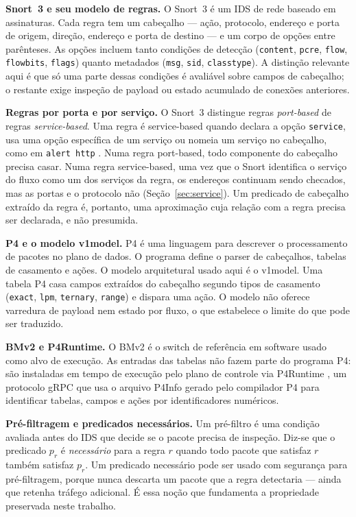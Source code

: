 \documentclass[12pt]{article}
\begin{document}
\textbf{Snort~3 e seu modelo de regras.} O Snort~3 é um IDS de rede baseado em
assinaturas. Cada regra tem um cabeçalho --- ação, protocolo, endereço e porta
de origem, direção, endereço e porta de destino --- e um corpo de opções entre
parênteses. As opções incluem tanto condições de detecção (\texttt{content},
\texttt{pcre}, \texttt{flow}, \texttt{flowbits}, \texttt{flags}) quanto
metadados (\texttt{msg}, \texttt{sid}, \texttt{classtype}). A distinção
relevante aqui é que só uma parte dessas condições é avaliável sobre campos de
cabeçalho; o restante exige inspeção de payload ou estado acumulado de
conexões anteriores.

\textbf{Regras por porta e por serviço.} O Snort~3 distingue regras
\emph{port-based} de regras \emph{service-based}. Uma regra é service-based
quando declara a opção \texttt{service}, usa uma opção específica de um
serviço ou nomeia um serviço no cabeçalho, como em
\texttt{alert http} \cite{snort3manual}. Numa regra port-based, todo
componente do cabeçalho precisa casar. Numa regra service-based, uma vez que o
Snort identifica o serviço do fluxo como um dos serviços da regra, os
endereços continuam sendo checados, mas as portas e o protocolo não
(Seção~\ref{sec:service}). Um predicado de cabeçalho extraído da regra é,
portanto, uma aproximação cuja relação com a regra precisa ser declarada, e
não presumida.

\textbf{P4 e o modelo v1model.} P4 \cite{p4spec2023} é uma linguagem para
descrever o processamento de pacotes no plano de dados. O programa define o
parser de cabeçalhos, tabelas de casamento e ações. O modelo arquitetural
usado aqui é o v1model. Uma tabela P4 casa campos extraídos do cabeçalho
segundo tipos de casamento (\texttt{exact}, \texttt{lpm}, \texttt{ternary},
\texttt{range}) e dispara uma ação. O modelo não oferece varredura de payload
nem estado por fluxo, o que estabelece o limite do que pode ser traduzido.

\textbf{BMv2 e P4Runtime.} O BMv2 \cite{bmv2} é o switch de referência em
software usado como alvo de execução. As entradas das tabelas não fazem parte
do programa P4: são instaladas em tempo de execução pelo plano de controle via
P4Runtime \cite{p4runtime2024}, um protocolo gRPC que usa o arquivo P4Info
gerado pelo compilador P4 para identificar tabelas, campos e ações por
identificadores numéricos.

\textbf{Pré-filtragem e predicados necessários.} Um pré-filtro é uma condição
avaliada antes do IDS que decide se o pacote precisa de inspeção. Diz-se que o
predicado $p_r$ é \emph{necessário} para a regra $r$ quando todo pacote que
satisfaz $r$ também satisfaz $p_r$. Um predicado necessário pode ser usado com
segurança para pré-filtragem, porque nunca descarta um pacote que a regra
detectaria --- ainda que retenha tráfego adicional. É essa noção que
fundamenta a propriedade preservada neste trabalho.
\end{document}

